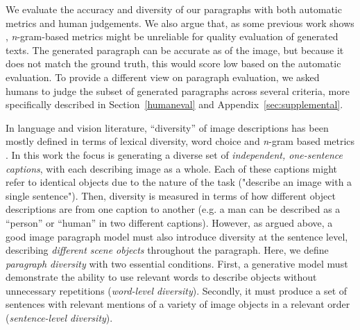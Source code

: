 \documentclass[11pt,a4paper]{article}
\begin{document}
We evaluate the accuracy and diversity of our paragraphs with both automatic metrics and human judgements.
We also argue that, as some previous work shows \cite{vanderlee2019}, \textit{n}-gram-based metrics might be unreliable for quality evaluation of generated texts.
The generated paragraph can be accurate as of the image, but because it does not match the ground truth, this would score low based on the automatic evaluation.
To provide a different view on paragraph evaluation, we asked humans to judge the subset of generated paragraphs across several criteria, more specifically described in Section~\ref{humaneval} and Appendix~\ref{sec:supplemental}.



In language and vision literature, ``diversity'' of image descriptions has been mostly defined in terms of lexical diversity, word choice and \textit{n}-gram based metrics \cite{Devlin2015, Vijayakumar2016, Lindh2018, VanMiltenburg2018}.
In this work the focus is generating a diverse set of \textit{independent, one-sentence captions}, with each describing image as a whole.
Each of these captions might refer to identical objects due to the nature of the task ("describe an image with a single sentence").
Then, diversity is measured in terms of how different object descriptions are from one caption to another (e.g. a man can be described as a ``person'' or ``human'' in two different captions).
However, as argued above, a good image paragraph model must also introduce diversity at the sentence level, describing \textit{different scene objects} throughout the paragraph. %
Here, we define \textit{paragraph diversity} with two essential conditions.
First, a generative model must demonstrate the ability to use %
relevant words to describe objects without unnecessary repetitions (\emph{word-level diversity}).
Secondly, it must produce a set of sentences with relevant mentions of a variety of image objects in a relevant order (\emph{sentence-level diversity}). 
\end{document}
